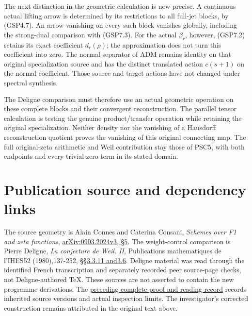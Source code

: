 The next distinction in the geometric calculation is now precise. A
continuous actual lifting arrow is determined by its restrictions to all
full-jet blocks, by (GSP4.7). An arrow vanishing on every such block
vanishes globally, including the strong-dual comparison with (GSP7.3).
For the actual \(\beta_r\), however, (GSP7.2) retains its exact
coefficient \(d_r(\rho)\); the approximation does not turn this
coefficient into zero. The normal separator of ADM remains identity on
that original specialization source and has the distinct translated
action \(c(s+1)\) on the normal coefficient. Those source and target
actions have not changed under spectral synthesis.

The Deligne comparison must therefore use an actual geometric operation
on these complete blocks and their convergent reconstruction. The
parallel tensor calculation is testing the genuine product/transfer
operation while retaining the original specialization. Neither density
nor the vanishing of a Hausdorff reconstruction quotient proves the
vanishing of this original connecting map. The full original-zeta
arithmetic and Weil contribution stay those of PSC5, with both endpoints
and every trivial-zero term in its stated domain.

\section{Publication source and dependency
links}\label{publication-source-and-dependency-links-8}

The source geometry is Alain Connes and Caterina Consani, \emph{Schemes
over F1 and zeta functions},
\href{https://arxiv.org/abs/0903.2024v3}{arXiv:0903.2024v3, §5}. The
weight-control comparison is Pierre Deligne, \emph{La conjecture de
Weil. II}, Publications mathematiques de l'IHES52 (1980),137-252,
\href{https://www.numdam.org/item/PMIHES_1980__52__137_0/}{§§3.3.11
and3.6}. Deligne material was read through the identified French
transcription and separately recorded peer source-page checks, not
Deligne-authored TeX. These sources are not asserted to contain the new
programme derivations. The
\href{https://github.com/KokunoYumeto/zeta-function-research-reader/blob/36a82ecca98addb8a98b48204e349737856c7223/workbenches/splitzero-tandem/continuations/20260924-cohomology-weight-and-character-lifts/BUILD_AND_REVIEW.md}{preceding
complete proof and reading record} records inherited source versions and
actual inspection limits. The investigator's corrected construction
remains attributed in the original text above.

